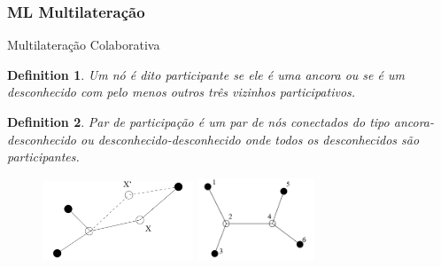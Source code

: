 \documentclass{beamer}
\newtheorem{definicao}{Definition}
\begin{document}
\begin{frame}
\frametitle{\normalsize ML Multilateração}
\begin{flushleft}
	Multilateração Colaborativa\\
	\vspace{0.2cm}
	\begin{definicao}
		Um nó é dito participante se ele é uma ancora ou se é um desconhecido com pelo menos outros três vizinhos participativos.
	\end{definicao}


	\begin{definicao}
		Par de participação é um par de nós conectados do tipo ancora-desconhecido ou desconhecido-desconhecido onde todos os desconhecidos são participantes.
	\end{definicao}

	\vspace{-0.15cm}
	
	\begin{figure} 
		\includegraphics[width=4.5cm]{unknow} 
		\includegraphics[width=3.5cm]{unknow2} 
	\end{figure}
\end{flushleft}
\end{frame}
\end{document}
